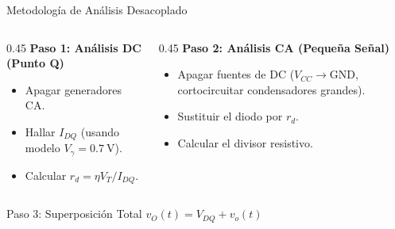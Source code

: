 \documentclass[10pt, aspectratio=169]{beamer}
\begin{document}
\begin{frame}{Metodología de Análisis Desacoplado}
  \begin{columns}
      \begin{column}{0.45\textwidth}
          \textbf{Paso 1: Análisis DC (Punto Q)}
          \begin{itemize}
              \item Apagar generadores CA.
              \item Hallar $I_{DQ}$ (usando modelo $V_\gamma = \qty{0.7}{\volt}$).
              \item Calcular $r_d = \eta V_T / I_{DQ}$.
          \end{itemize}
      \end{column}
      
      \begin{column}{0.45\textwidth}
          \textbf{Paso 2: Análisis CA (Pequeña Señal)}
          \begin{itemize}
              \item Apagar fuentes de DC ($V_{CC} \to \text{GND}$, cortocircuitar condensadores grandes).
              \item Sustituir el diodo por $r_d$.
              \item Calcular el divisor resistivo.
          \end{itemize}
      \end{column}
  \end{columns}
  
  \vspace{0.5cm}
  \begin{block}{Paso 3: Superposición Total}
      \centering $v_O(t) = V_{DQ} + v_o(t)$
  \end{block}
\end{frame}
\end{document}
